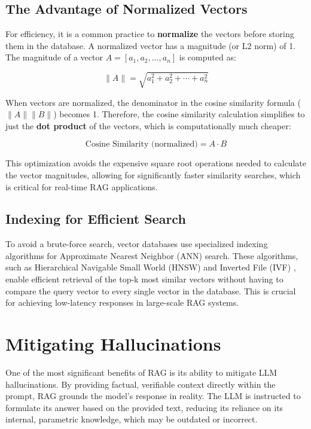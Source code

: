 \subsection{The Advantage of Normalized Vectors}
For efficiency, it is a common practice to \textbf{normalize} the vectors before storing them in the database. A normalized vector has a magnitude (or L2 norm) of 1. The magnitude of a vector \(A = [a_1, a_2, \ldots, a_n]\) is computed as:

\begin{equation}
\|A\| = \sqrt{a_1^2 + a_2^2 + \cdots + a_n^2}
\end{equation}

When vectors are normalized, the denominator in the cosine similarity formula (\(\|A\| \|B\|\)) becomes 1. Therefore, the cosine similarity calculation simplifies to just the \textbf{dot product} of the vectors, which is computationally much cheaper:

\begin{equation}
\text{Cosine Similarity (normalized)} = A \cdot B
\end{equation}

This optimization avoids the expensive square root operations needed to calculate the vector magnitudes, allowing for significantly faster similarity searches, which is critical for real-time RAG applications.


\subsection{Indexing for Efficient Search}
To avoid a brute-force search, vector databases use specialized indexing algorithms for Approximate Nearest Neighbor (ANN) search. These algorithms, such as Hierarchical Navigable Small World (HNSW) \autocite{hnsw_malkov_2018} and Inverted File (IVF) \autocite{ivf_zobel}, enable efficient retrieval of the top-k most similar vectors without having to compare the query vector to every single vector in the database. This is crucial for achieving low-latency responses in large-scale RAG systems.

\section{Mitigating Hallucinations}
One of the most significant benefits of RAG is its ability to mitigate LLM hallucinations. By providing factual, verifiable context directly within the prompt, RAG grounds the model's response in reality. The LLM is instructed to formulate its answer based on the provided text, reducing its reliance on its internal, parametric knowledge, which may be outdated or incorrect.

